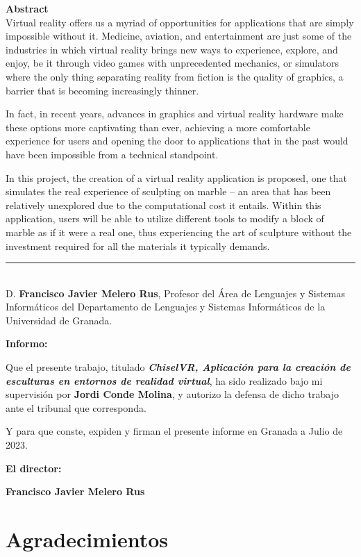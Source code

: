 \noindent\textbf{Abstract}\\
Virtual reality offers us a myriad of opportunities for applications that are simply impossible without it. Medicine, aviation, and entertainment are just some of the industries in which virtual reality brings new ways to experience, explore, and enjoy, be it through video games with unprecedented mechanics, or simulators where the only thing separating reality from fiction is the quality of graphics, a barrier that is becoming increasingly thinner.

In fact, in recent years, advances in graphics and virtual reality hardware make these options more captivating than ever, achieving a more comfortable experience for users and opening the door to applications that in the past would have been impossible from a technical standpoint.

In this project, the creation of a virtual reality application is proposed, one that simulates the real experience of sculpting on marble – an area that has been relatively unexplored due to the computational cost it entails. Within this application, users will be able to utilize different tools to modify a block of marble as if it were a real one, thus experiencing the art of sculpture without the investment required for all the materials it typically demands.

\cleardoublepage

\thispagestyle{empty}

\noindent\rule[-1ex]{\textwidth}{2pt}\\[4.5ex]

D. \textbf{Francisco Javier Melero Rus}, Profesor del Área de Lenguajes y Sistemas Informáticos del Departamento de Lenguajes y Sistemas Informáticos de la Universidad de Granada.

\vspace{0.5cm}

\textbf{Informo:}

\vspace{0.5cm}

Que el presente trabajo, titulado \textit{\textbf{ChiselVR, Aplicación para la creación de esculturas en entornos de realidad virtual}},
ha sido realizado bajo mi supervisión por \textbf{Jordi Conde Molina}, y autorizo la defensa de dicho trabajo ante el tribunal
que corresponda.

\vspace{0.5cm}

Y para que conste, expiden y firman el presente informe en Granada a Julio de 2023.

\vspace{1cm}

\textbf{El director: }

\vspace{5cm}

\noindent \textbf{Francisco Javier Melero Rus}

\chapter*{Agradecimientos}




